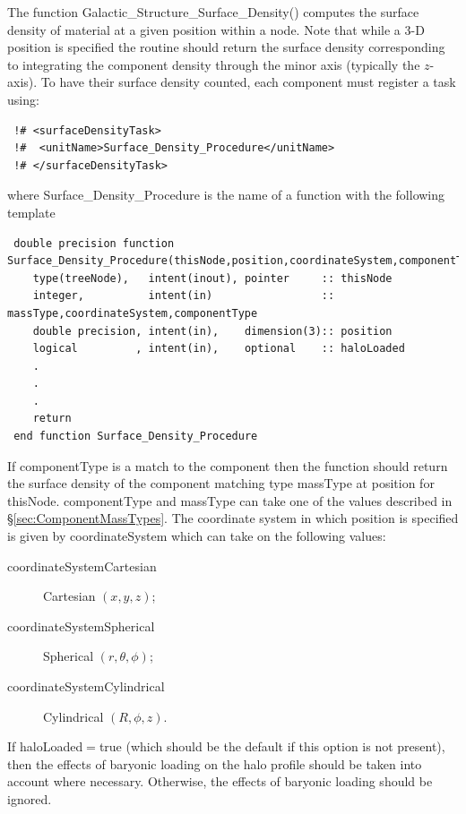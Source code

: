 The function {\normalfont \ttfamily Galactic\_Structure\_Surface\_Density()} computes the surface density of material at a given position within a node. Note that while a 3-D position is specified the routine should return the surface density corresponding to integrating the component density through the minor axis (typically the $z$-axis). To have their surface density counted, each component must register a task using:
\begin{verbatim}
 !# <surfaceDensityTask>
 !#  <unitName>Surface_Density_Procedure</unitName>
 !# </surfaceDensityTask>
\end{verbatim}
where {\normalfont \ttfamily Surface\_Density\_Procedure} is the name of a function with the following template
\begin{verbatim}
 double precision function Surface_Density_Procedure(thisNode,position,coordinateSystem,componentType,massType,haloLoaded)
    type(treeNode),   intent(inout), pointer     :: thisNode
    integer,          intent(in)                 :: massType,coordinateSystem,componentType
    double precision, intent(in),    dimension(3):: position
    logical         , intent(in),    optional    :: haloLoaded
    .
    .
    .
    return
 end function Surface_Density_Procedure
\end{verbatim}
If {\normalfont \ttfamily componentType} is a match to the component then the function should return the surface density of the component matching type {\normalfont \ttfamily massType} at {\normalfont \ttfamily position} for {\normalfont \ttfamily thisNode}. {\normalfont \ttfamily componentType} and {\normalfont \ttfamily massType} can take one of the values described in \S\ref{sec:ComponentMassTypes}.
The coordinate system in which {\normalfont \ttfamily position} is specified is given by {\normalfont \ttfamily coordinateSystem} which can take on the following values:
\begin{description}
 \item [{\normalfont \ttfamily coordinateSystemCartesian}] Cartesian $(x,y,z)$;
 \item [{\normalfont \ttfamily coordinateSystemSpherical}] Spherical $(r,\theta,\phi)$;
 \item [{\normalfont \ttfamily coordinateSystemCylindrical}] Cylindrical $(R,\phi,z)$.
\end{description}
If {\normalfont \ttfamily haloLoaded}$=${\normalfont \ttfamily true} (which should be the default if this option is not present), then the effects of baryonic loading on the halo profile should be taken into account where necessary. Otherwise, the effects of baryonic loading should be ignored.

